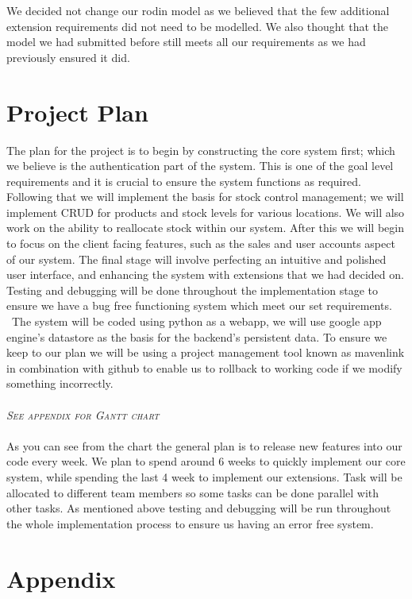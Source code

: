 \documentclass[a4paper]{article}
\begin{document}
We decided not change our rodin model as we believed that the few additional extension requirements did not need to be modelled. We also thought that the model we had submitted before still meets all our requirements as we had previously ensured it did.
\pagebreak
\section{Project Plan}
The plan for the project is to begin by constructing the core system first; which we believe is the authentication part of the system. This is one of the goal level requirements and it is crucial to ensure the system functions as required. Following that we will implement the basis for stock control management; we will implement CRUD for products and stock levels for various locations. We will also work on the ability to reallocate stock within our system. After this we will begin to focus on the client facing features, such as the sales and user accounts aspect of our system. The final stage will involve perfecting an intuitive and polished user interface, and enhancing the system with extensions that we had decided on. Testing and debugging will be done throughout the implementation stage to ensure we have a bug free functioning system which meet our set requirements. 
\\\
The system will be coded using python as a webapp, we will use google app engine’s datastore as the basis for the backend’s persistent data. To ensure we keep to our plan we will be using a project management tool known as mavenlink in combination with github to enable us to rollback to working code if we modify something incorrectly.
\\\\
\textsc{ \emph{See appendix for Gantt chart}} 
\\\\
As you can see from the chart the general plan is to release new features into our code every week. We plan to spend around 6 weeks to quickly implement our core system, while spending the last 4 week to implement our extensions. Task will be allocated to different team members so some tasks can be done parallel with other tasks. As mentioned above testing and debugging will be run throughout the whole implementation process to ensure us having an error free system. 
\pagebreak
\section{Appendix}
\end{document}
